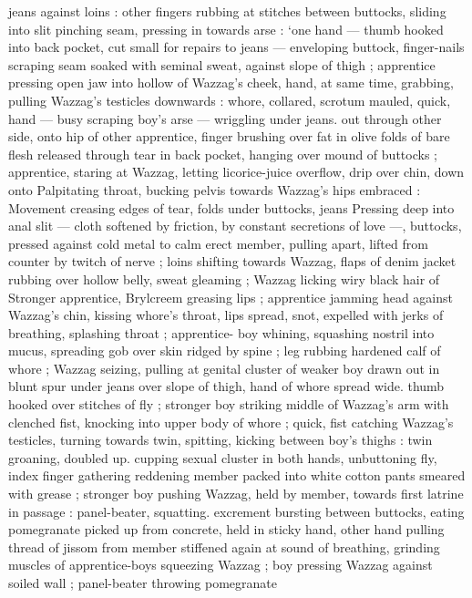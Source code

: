 jeans against loins : other fingers rubbing at stitches between 
buttocks, sliding into slit pinching seam, pressing in towards arse : 
‘one hand --- thumb hooked into back pocket, cut small for repairs to 
jeans --- enveloping buttock, finger-nails scraping seam soaked with 
seminal sweat, against slope of thigh ; apprentice pressing open jaw 
into hollow of Wazzag's cheek, hand, at same time, grabbing, pulling 
Wazzag's testicles downwards : whore, collared, scrotum mauled, 
quick, hand --- busy scraping boy's arse --- wriggling under jeans. 
out through other side, onto hip of other apprentice, finger brushing 
over fat in olive folds of bare flesh released through tear in back 
pocket, hanging over mound of buttocks ; apprentice, staring at 
Wazzag, letting licorice-juice overflow, drip over chin, down onto 
Palpitating throat, bucking pelvis towards Wazzag's hips embraced : 
Movement creasing edges of tear, folds under buttocks, jeans 
Pressing deep into anal slit --- cloth softened by friction, by constant 
secretions of love ---, buttocks, pressed against cold metal to calm 
erect member, pulling apart, lifted from counter by twitch of nerve ; 
loins shifting towards Wazzag, flaps of denim jacket rubbing over 
hollow belly, sweat gleaming ; Wazzag licking wiry black hair of 
Stronger apprentice, Brylcreem greasing lips ; apprentice jamming 
head against Wazzag's chin, kissing whore's throat, lips spread, 
snot, expelled with jerks of breathing, splashing throat ; apprentice- 
boy whining, squashing nostril into mucus, spreading gob over skin 
ridged by spine ; leg rubbing hardened calf of whore ; Wazzag 
seizing, pulling at genital cluster of weaker boy drawn out in blunt 
spur under jeans over slope of thigh, hand of whore spread wide. 
thumb hooked over stitches of fly ; stronger boy striking middle of 
Wazzag's arm with clenched fist, knocking into upper body of whore 
; quick, fist catching Wazzag's testicles, turning towards twin, 
spitting, kicking between boy's thighs : twin groaning, doubled up. 
cupping sexual cluster in both hands, unbuttoning fly, index finger 
gathering reddening member packed into white cotton pants 
smeared with grease ; stronger boy pushing Wazzag, held by 
member, towards first latrine in passage : panel-beater, squatting. 
excrement bursting between buttocks, eating pomegranate picked up 
from concrete, held in sticky hand, other hand pulling thread of 
jissom from member stiffened again at sound of breathing, grinding 
muscles of apprentice-boys squeezing Wazzag ; boy pressing 
Wazzag against soiled wall ; panel-beater throwing pomegranate 
